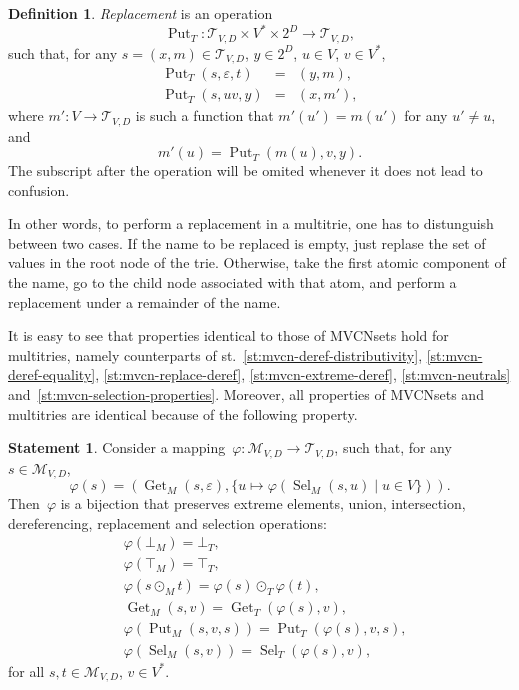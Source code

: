 \documentclass{article}
\theoremstyle{definition}
\newtheorem{Df}{Definition}
\newtheorem{St}{Statement}
\newcommand{\setcharmvcn}{M}
\newcommand{\setcharmt}{T}
\newcommand{\setsymbol}[3]{\mathcal{#1}_{#2,#3}}
\newcommand{\setmvcn}[2]{\setsymbol{\setcharmvcn}{#1}{#2}}
\newcommand{\setmt}[2]{\setsymbol{\setcharmt}{#1}{#2}}
\newcommand{\select}{\operatorname{Sel}}
\newcommand{\deref}{\operatorname{Get}}
\newcommand{\putval}{\operatorname{Put}}
\begin{document}
\begin{Df}\label{df:mt-replace}
\emph{Replacement} is an operation
\[
  \putval_\setcharmt : \setmt{V}{D} \times V^\ast \times 2^D \to \setmt{V}{D},
\]
such that, for any
$s = (x, m) \in \setmt{V}{D}$, $y \in 2^D$, $u \in V$, $v \in V^\ast$,
\begin{eqnarray*}
  \putval_\setcharmt(s, \varepsilon, t) & = & (y, m) , \\
  \putval_\setcharmt(s, u v, y) & = & (x, m') ,
\end{eqnarray*}
where $m' : V \to \setmt{V}{D}$ is such a function that $m'(u') = m(u')$ for any
$u'\neq u$, and
\[
  m'(u) = \putval_\setcharmt(m(u), v, y) .
\]
The subscript after the operation will be omited whenever it does not lead to
confusion.
\end{Df}

In other words, to perform a replacement in a multitrie, one has to distunguish
between two cases. If the name to be replaced is empty, just replase the set of
values in the root node of the trie. Otherwise, take the first atomic component
of the name, go to the child node associated with that atom, and perform a
replacement under a remainder of the name.

It is easy to see that properties identical to those of MVCNsets
hold for multitries, namely counterparts of
st.~\ref{st:mvcn-deref-distributivity},
\ref{st:mvcn-deref-equality},
\ref{st:mvcn-replace-deref},
\ref{st:mvcn-extreme-deref},
\ref{st:mvcn-neutrals}
and~\ref{st:mvcn-selection-properties}.
Moreover, all properties of MVCNsets and multitries are identical because
of the following property.

\begin{St}\label{st:isomorph}
Consider a mapping~$\varphi: \setmvcn{V}{D} \to \setmt{V}{D}$, such that,
for any~$s\in \setmvcn{V}{D}$,
\[
  \varphi(s) = (
    \deref_\setcharmvcn(s, \varepsilon) ,
    \{ u \mapsto \varphi(\select_\setcharmvcn(s, u) \mid u\in V \})
  ) .
\]
Then~$\varphi$ is a bijection that preserves
extreme elements, union, intersection, dereferencing, replacement and selection
operations:
\begin{eqnarray*}
  & \varphi(\bot_{\setcharmvcn}) = \bot_{\setcharmt}, \\
  & \varphi(\top_{\setcharmvcn}) = \top_{\setcharmt}, \\
  & \varphi(s \mathbin{\odot_{\setcharmvcn}} t) =
      \varphi(s) \mathbin{\odot_{\setcharmt}} \varphi(t) , \\
  & \deref_{\setcharmvcn}(s, v) =
      \deref_{\setcharmt}(\varphi(s), v) , \\
  & \varphi(\putval_{\setcharmvcn}(s, v, s)) =
      \putval_{\setcharmt}(\varphi(s), v, s) , \\
  & \varphi(\select_{\setcharmvcn}(s, v)) =
      \select_{\setcharmt}(\varphi(s), v) ,
\end{eqnarray*}
for all $s,t \in \setmvcn{V}{D}$, $v \in V^\ast$.
\end{St}
\end{document}
